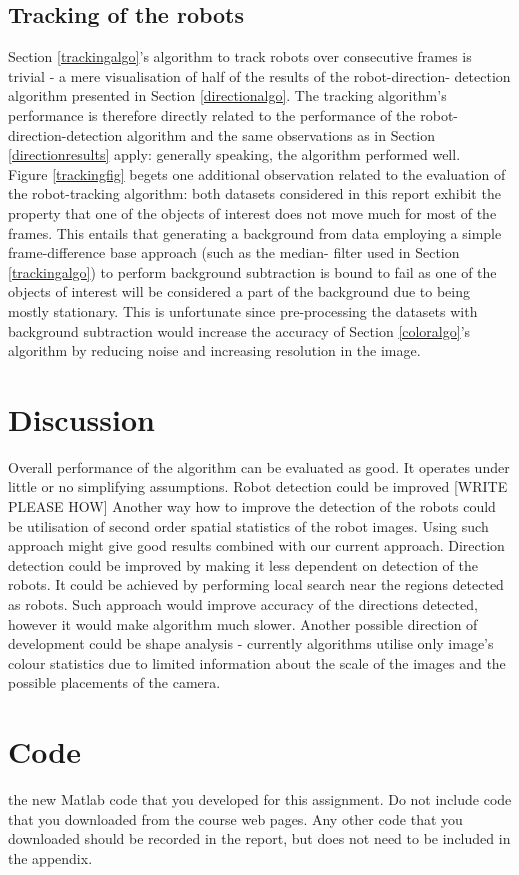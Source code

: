 \documentclass[10pt,a4paper]{article}
\begin{document}
\subsection{Tracking of the robots}\label{trackingresults}
Section \ref{trackingalgo}'s algorithm to track robots over consecutive frames
is trivial - a mere visualisation of half of the results of the robot-direction-
detection algorithm presented in Section \ref{directionalgo}. The tracking 
algorithm's performance is therefore directly related to the performance of 
the robot-direction-detection algorithm and the same observations as in Section
\ref{directionresults} apply: generally speaking, the algorithm performed 
well.\\
Figure \ref{trackingfig} begets one additional observation related to the
evaluation of the robot-tracking algorithm: both datasets considered in this
report exhibit the property that one of the objects of interest does not move
much for most of the frames. This entails that generating a background from
data employing a simple frame-difference base approach (such as the median-
filter used in Section \ref{trackingalgo}) to perform background subtraction 
is bound to  fail as one of the objects of interest will be considered a part 
of the background due to being mostly stationary. This is unfortunate since
pre-processing the datasets with background subtraction would increase the
accuracy of Section \ref{coloralgo}'s algorithm by reducing noise and increasing
resolution in the image.


\section{Discussion}\label{discussion}
Overall performance of the algorithm can be evaluated as good. It operates 
under little or no simplifying assumptions.
Robot detection could be improved [WRITE PLEASE HOW]
Another way how to improve the detection of the robots could be utilisation of 
second order spatial statistics of the robot images. Using such approach might 
give good results combined with our current approach.
Direction detection could be improved by making it less dependent on detection 
of the robots. It could be achieved by performing local search near the regions 
detected as robots. Such approach would improve accuracy of the directions 
detected, however it would make algorithm much slower. 
Another possible direction of development could be shape analysis - currently 
algorithms utilise only image's colour statistics due to limited information 
about the scale of the images and the possible placements of the camera. 


\section{Code}\label{code}
the new Matlab code that you developed for this assignment. Do not
include code that you downloaded from the course web pages. Any other code
that you downloaded should be recorded in the report, but does not need to
be included in the appendix.
\end{document}
